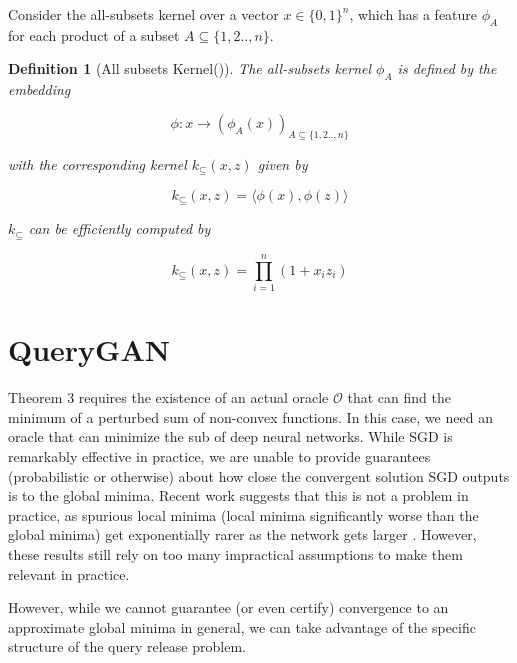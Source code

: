 \documentclass[]{article}
\newcommand{\B}{\{0,1\}}
\newtheorem{definition}{Definition}[section]
\theoremstyle{definition}
\begin{document}
Consider the all-subsets kernel over a vector $x \in \B^n$, which has a feature $\phi_A$ for each product of a subset $A \subseteq \{1,2..,n\}$. 

\begin{definition}[All subsets Kernel(\cite{SC})]
    The all-subsets kernel $\phi_A$ is defined by the embedding
    
    \begin{equation}
        \phi : x \to (\phi_A(x))_{A \subseteq \{1,2..,n\}}
    \end{equation}

    with the corresponding kernel $k_\subseteq(x,z)$ given by
    
    \begin{equation}
        k_\subseteq(x,z) = \langle \phi(x), \phi(z) \rangle 
    \end{equation}
    
    $k_\subseteq$ can be efficiently computed by

    \begin{equation}
        k_\subseteq(x,z) = \prod_{i=1}^n (1 + x_iz_i)
    \end{equation}
\end{definition}


\section{QueryGAN}

Theorem 3 requires the existence of an actual oracle $\mathcal{O}$ that can find the minimum of a perturbed sum of non-convex functions. In this case, we need an oracle that can minimize the sub of deep neural networks. While SGD is remarkably effective in practice, we are unable to provide guarantees (probabilistic or otherwise) about how close the convergent solution SGD outputs is to the global minima. Recent work suggests that this is not a problem in practice, as spurious local minima (local minima significantly worse than the global minima) get exponentially rarer as the network gets larger \cite{CHM+14}. However, these results still rely on too many impractical assumptions to make them relevant in practice. 

However, while we cannot guarantee (or even certify) convergence to an approximate global minima in general, we can take advantage of the specific structure of the query release problem. 
\end{document}
